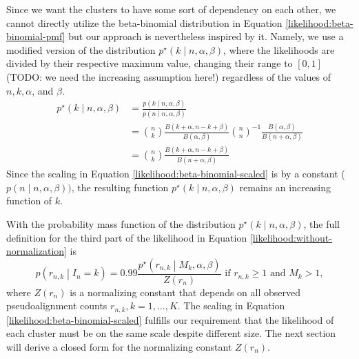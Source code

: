 \documentclass[officiallayout]{tktla}
\begin{document}
Since we want the clusters to have some sort of dependency on each
other, we cannot directly utilize the beta-binomial distribution in
Equation \ref{likelihood:beta-binomial-pmf} but our approach is
nevertheless inspired by it. Namely, we use a modified version of the
distribution $p^{\star}\left(k \middle| n, \alpha, \beta\right)$,
where the likelihoods are divided by their respective maximum value,
changing their range to $\left[0, 1\right]$ (TODO: we need the
increasing assumption here!) regardless of the values of $n, k,
\alpha$, and $\beta$.
\begin{equation}
  \label{likelihood:beta-binomial-scaled}
  \begin{aligned}
    p^{\star}\left(k \middle| n, \alpha, \beta\right) &= \frac{p\left(k \middle| n, \alpha, \beta\right)}{p\left(n \middle| n, \alpha, \beta\right)} \\
    &= \binom{n}{k}\frac{B\left(k + \alpha, n - k + \beta\right)}{B\left(\alpha, \beta\right)} \binom{n}{n}^{-1}\frac{B\left(\alpha, \beta\right)}{B\left(n + \alpha, \beta\right)} \\
    &= \binom{n}{k}\frac{B\left(k + \alpha, n - k + \beta\right)}{B\left(n + \alpha, \beta\right)}
  \end{aligned}
\end{equation}
Since the scaling in Equation \ref{likelihood:beta-binomial-scaled} is
by a constant ($p\left(n \middle| n, \alpha, \beta\right))$, the
resulting function $p^{\star}\left(k \middle| n, \alpha,
\beta\right)$ remains an increasing function of $k$.

With the probability mass function of the distribution
$p^{\star}\left(k \middle| n, \alpha, \beta\right)$, the full
definition for the third part of the likelihood in Equation \ref{likelihood:without-normalization} is
\begin{equation}
  \label{likelihood:normalized}
  p\left(r_{n, k} \middle| I_{n} = k\right) = 0.99\frac{p^{\star}\left(r_{n, k} \middle| M_{k}, \alpha, \beta\right)}{Z\left(r_{n}\right)}\text{ if } r_{n, k} \geq 1\text{ and } M_{k} > 1,
\end{equation}
where $Z\left(r_{n}\right)$ is a normalizing constant that depends on
all observed pseudoalignment counts $r_{n, k}, k = 1, \dots, K$. The
scaling in Equation \ref{likelihood:beta-binomial-scaled} fulfills our
requirement that the likelihood of each cluster must be on the same
scale despite different size. The next section will derive a closed
form for the normalizing constant $Z\left(r_{n}\right)$.
\end{document}

